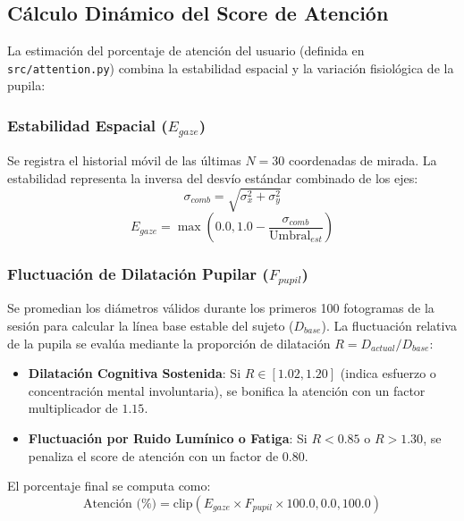 \documentclass[twocolumn,10pt,letterpaper]{article}
\begin{document}
\subsection{Cálculo Dinámico del Score de Atención}
La estimación del porcentaje de atención del usuario (definida en \texttt{src/attention.py}) combina la estabilidad espacial y la variación fisiológica de la pupila:

\subsubsection{Estabilidad Espacial ($E_{gaze}$)}
Se registra el historial móvil de las últimas $N = 30$ coordenadas de mirada. La estabilidad representa la inversa del desvío estándar combinado de los ejes:
\begin{equation}
    \sigma_{comb} = \sqrt{\sigma_x^2 + \sigma_y^2}
\end{equation}
\begin{equation}
    E_{gaze} = \max\left(0.0, 1.0 - \frac{\sigma_{comb}}{\text{Umbral}_{est}}\right)
\end{equation}

\subsubsection{Fluctuación de Dilatación Pupilar ($F_{pupil}$)}
Se promedian los diámetros válidos durante los primeros 100 fotogramas de la sesión para calcular la línea base estable del sujeto ($D_{base}$). La fluctuación relativa de la pupila se evalúa mediante la proporción de dilatación $R = D_{actual} / D_{base}$:
\begin{itemize}
    \item \textbf{Dilatación Cognitiva Sostenida}: Si $R \in [1.02, 1.20]$ (indica esfuerzo o concentración mental involuntaria), se bonifica la atención con un factor multiplicador de $1.15$.
    \item \textbf{Fluctuación por Ruido Lumínico o Fatiga}: Si $R < 0.85$ o $R > 1.30$, se penaliza el score de atención con un factor de $0.80$.
\end{itemize}

El porcentaje final se computa como:
\begin{equation}
    \text{Atención (\%)} = \text{clip}(E_{gaze} \times F_{pupil} \times 100.0, 0.0, 100.0)
\end{equation}
\end{document}
